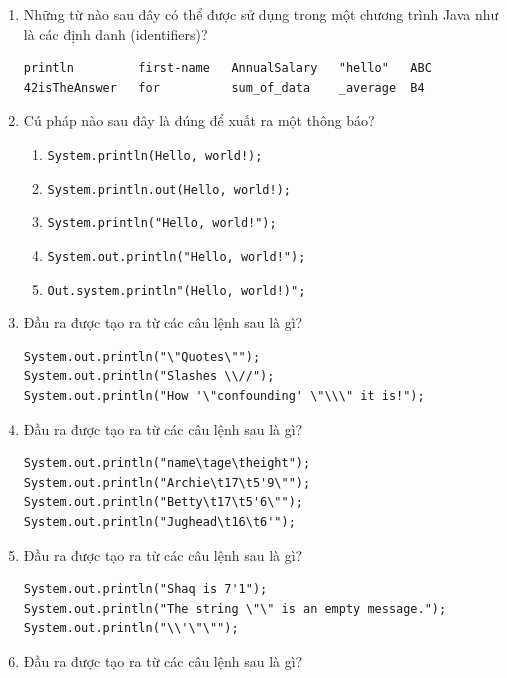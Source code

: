 \begin{enumerate}
\def\labelenumi{\arabic{enumi}.}
\setcounter{enumi}{5}
\item
  Những từ nào sau đây có thể được sử dụng trong một chương trình Java
  như là các định danh (identifiers)?

\begin{verbatim}
println         first-name   AnnualSalary   "hello"   ABC
42isTheAnswer   for          sum_of_data    _average  B4
\end{verbatim}
\item
  Cú pháp nào sau đây là đúng để xuất ra một thông báo?

  \begin{enumerate}
  \def\labelenumii{\alph{enumii}.}
  \tightlist
  \item
    \texttt{System.println(Hello,\ world!);}
  \item
    \texttt{System.println.out(\textquotesingle{}Hello,\ world!\textquotesingle{});}
  \item
    \texttt{System.println("Hello,\ world!");}
  \item
    \texttt{System.out.println("Hello,\ world!");}
  \item
    \texttt{Out.system.println"(Hello,\ world!)";}
  \end{enumerate}
\item
  Đầu ra được tạo ra từ các câu lệnh sau là gì?

\begin{verbatim}
System.out.println("\"Quotes\"");
System.out.println("Slashes \\//");
System.out.println("How '\"confounding' \"\\\" it is!");
\end{verbatim}
\item
  Đầu ra được tạo ra từ các câu lệnh sau là gì?

\begin{verbatim}
System.out.println("name\tage\theight");
System.out.println("Archie\t17\t5'9\"");
System.out.println("Betty\t17\t5'6\"");
System.out.println("Jughead\t16\t6'");
\end{verbatim}
\item
  Đầu ra được tạo ra từ các câu lệnh sau là gì?

\begin{verbatim}
System.out.println("Shaq is 7'1");
System.out.println("The string \"\" is an empty message.");
System.out.println("\\'\"\"");
\end{verbatim}
\item
  Đầu ra được tạo ra từ các câu lệnh sau là gì?


\end{enumerate}
